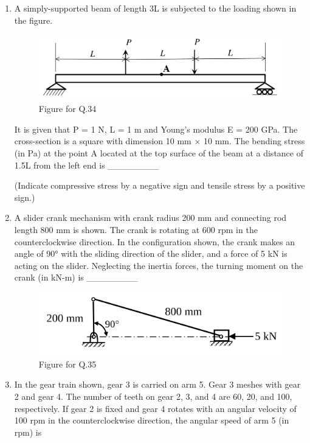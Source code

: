 \documentclass[journal,11pt,onecolumn]{IEEEtran}
\begin{document}
\begin{enumerate}[resume]
    \item A simply-supported beam of length 3L is subjected to the loading shown in the figure.

          \begin{figure}[H]
              \centering
              \includegraphics[scale=0.3]{q34}
              \caption{Figure for Q.34}
              \label{q34}
          \end{figure}

          It is given that P = 1 N, L = 1 m and Young's modulus E = 200 GPa. The cross-section is a square with dimension 10 mm × 10 mm. The bending stress (in Pa) at the point A located at the top surface of the beam at a distance of 1.5L from the left end is \_\_\_\_\_\_\_\_

          (Indicate compressive stress by a negative sign and tensile stress by a positive sign.)

    \item A slider crank mechanism with crank radius 200 mm and connecting rod length 800 mm is shown. The crank is rotating at 600 rpm in the counterclockwise direction. In the configuration shown, the crank makes an angle of 90° with the sliding direction of the slider, and a force of 5 kN is acting on the slider. Neglecting the inertia forces, the turning moment on the crank (in kN-m) is \_\_\_\_\_\_\_\_

          \begin{figure}[H]
              \centering
              \includegraphics[scale=0.3]{q35}
              \caption{Figure for Q.35}
              \label{q35}
          \end{figure}

    \item In the gear train shown, gear 3 is carried on arm 5. Gear 3 meshes with gear 2 and gear 4. The number of teeth on gear 2, 3, and 4 are 60, 20, and 100, respectively. If gear 2 is fixed and gear 4 rotates with an angular velocity of 100 rpm in the counterclockwise direction, the angular speed of arm 5 (in rpm) is


\end{enumerate}
\end{document}
